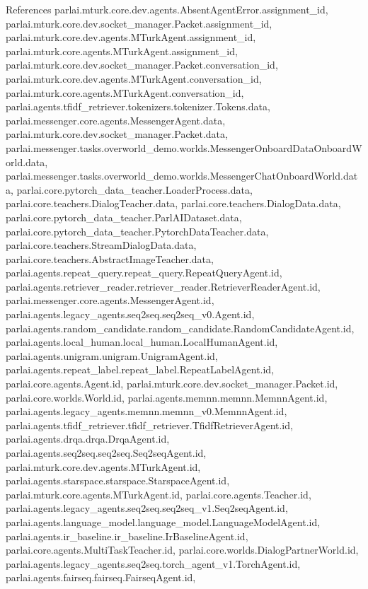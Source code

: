 References parlai.\+mturk.\+core.\+dev.\+agents.\+Absent\+Agent\+Error.\+assignment\+\_\+id, parlai.\+mturk.\+core.\+dev.\+socket\+\_\+manager.\+Packet.\+assignment\+\_\+id, parlai.\+mturk.\+core.\+dev.\+agents.\+M\+Turk\+Agent.\+assignment\+\_\+id, parlai.\+mturk.\+core.\+agents.\+M\+Turk\+Agent.\+assignment\+\_\+id, parlai.\+mturk.\+core.\+dev.\+socket\+\_\+manager.\+Packet.\+conversation\+\_\+id, parlai.\+mturk.\+core.\+dev.\+agents.\+M\+Turk\+Agent.\+conversation\+\_\+id, parlai.\+mturk.\+core.\+agents.\+M\+Turk\+Agent.\+conversation\+\_\+id, parlai.\+agents.\+tfidf\+\_\+retriever.\+tokenizers.\+tokenizer.\+Tokens.\+data, parlai.\+messenger.\+core.\+agents.\+Messenger\+Agent.\+data, parlai.\+mturk.\+core.\+dev.\+socket\+\_\+manager.\+Packet.\+data, parlai.\+messenger.\+tasks.\+overworld\+\_\+demo.\+worlds.\+Messenger\+Onboard\+Data\+Onboard\+World.\+data, parlai.\+messenger.\+tasks.\+overworld\+\_\+demo.\+worlds.\+Messenger\+Chat\+Onboard\+World.\+data, parlai.\+core.\+pytorch\+\_\+data\+\_\+teacher.\+Loader\+Process.\+data, parlai.\+core.\+teachers.\+Dialog\+Teacher.\+data, parlai.\+core.\+teachers.\+Dialog\+Data.\+data, parlai.\+core.\+pytorch\+\_\+data\+\_\+teacher.\+Parl\+A\+I\+Dataset.\+data, parlai.\+core.\+pytorch\+\_\+data\+\_\+teacher.\+Pytorch\+Data\+Teacher.\+data, parlai.\+core.\+teachers.\+Stream\+Dialog\+Data.\+data, parlai.\+core.\+teachers.\+Abstract\+Image\+Teacher.\+data, parlai.\+agents.\+repeat\+\_\+query.\+repeat\+\_\+query.\+Repeat\+Query\+Agent.\+id, parlai.\+agents.\+retriever\+\_\+reader.\+retriever\+\_\+reader.\+Retriever\+Reader\+Agent.\+id, parlai.\+messenger.\+core.\+agents.\+Messenger\+Agent.\+id, parlai.\+agents.\+legacy\+\_\+agents.\+seq2seq.\+seq2seq\+\_\+v0.\+Agent.\+id, parlai.\+agents.\+random\+\_\+candidate.\+random\+\_\+candidate.\+Random\+Candidate\+Agent.\+id, parlai.\+agents.\+local\+\_\+human.\+local\+\_\+human.\+Local\+Human\+Agent.\+id, parlai.\+agents.\+unigram.\+unigram.\+Unigram\+Agent.\+id, parlai.\+agents.\+repeat\+\_\+label.\+repeat\+\_\+label.\+Repeat\+Label\+Agent.\+id, parlai.\+core.\+agents.\+Agent.\+id, parlai.\+mturk.\+core.\+dev.\+socket\+\_\+manager.\+Packet.\+id, parlai.\+core.\+worlds.\+World.\+id, parlai.\+agents.\+memnn.\+memnn.\+Memnn\+Agent.\+id, parlai.\+agents.\+legacy\+\_\+agents.\+memnn.\+memnn\+\_\+v0.\+Memnn\+Agent.\+id, parlai.\+agents.\+tfidf\+\_\+retriever.\+tfidf\+\_\+retriever.\+Tfidf\+Retriever\+Agent.\+id, parlai.\+agents.\+drqa.\+drqa.\+Drqa\+Agent.\+id, parlai.\+agents.\+seq2seq.\+seq2seq.\+Seq2seq\+Agent.\+id, parlai.\+mturk.\+core.\+dev.\+agents.\+M\+Turk\+Agent.\+id, parlai.\+agents.\+starspace.\+starspace.\+Starspace\+Agent.\+id, parlai.\+mturk.\+core.\+agents.\+M\+Turk\+Agent.\+id, parlai.\+core.\+agents.\+Teacher.\+id, parlai.\+agents.\+legacy\+\_\+agents.\+seq2seq.\+seq2seq\+\_\+v1.\+Seq2seq\+Agent.\+id, parlai.\+agents.\+language\+\_\+model.\+language\+\_\+model.\+Language\+Model\+Agent.\+id, parlai.\+agents.\+ir\+\_\+baseline.\+ir\+\_\+baseline.\+Ir\+Baseline\+Agent.\+id, parlai.\+core.\+agents.\+Multi\+Task\+Teacher.\+id, parlai.\+core.\+worlds.\+Dialog\+Partner\+World.\+id, parlai.\+agents.\+legacy\+\_\+agents.\+seq2seq.\+torch\+\_\+agent\+\_\+v1.\+Torch\+Agent.\+id, parlai.\+agents.\+fairseq.\+fairseq.\+Fairseq\+Agent.\+id, 